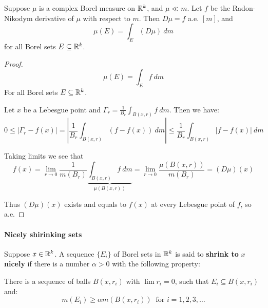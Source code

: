 \begin{theorem}\label{derivative}
    Suppose $\mu$ is a complex Borel measure on $\mathbb{R}^k$, and $\mu \ll m$. Let $f$ be the Radon-Nikodym derivative of $\mu$ with respect to $m$. Then $D\mu = f$ a.e. $[m]$, and
    \[\mu(E) = \int_E(D\mu)~dm\] for all Borel sets $E\subseteq \mathbb{R}^k$.
    \begin{proof}
        \[\mu(E) = \int_E f~dm\] For all Borel sets $E\subseteq \mathbb{R}^k$.

        Let $x$ be a Lebesgue point and $\Gamma_r = \frac{1}{B_r}\int_{B(x,r)}f~dm$. Then we have:\begin{equation*}
            0\leq |\Gamma_r - f(x)| = |\frac{1}{B_r}\int_{B(x,r)}(f-f(x))~dm| \leq \frac{1}{B_r}\int_{B(x,r)}|f-f(x)|~dm
        \end{equation*}

        Taking limits we see that \[f(x) = \lim_{r\rightarrow 0}\frac{1}{m(B_r)}\underbrace{\int_{B(x,r)}f~dm}_{\mu(B(x,r))} = \lim_{r\rightarrow 0}\frac{\mu(B(x,r))}{m(B_r)} = (D\mu)(x) \]
    
        Thus $(D\mu)(x)$ exists and equals to $f(x)$ at every Lebesgue point of $f$, so a.e.
    \end{proof}
\end{theorem}

\paragraph*{Nicely shirinking sets}
\begin{definition}
    Suppose $x\in \mathbb{R}^k$. A sequence $\{E_i\}$ of Borel sets in $\mathbb{R}^k$ is said to \textbf{shrink to }$x$\textbf{ nicely} if there is a number $\alpha>0$ with the following property:\begin{center}
        There is a sequence of balls $B(x,r_i)$ with $\lim r_i = 0$, such that $E_i\subseteq B(x,r_i)$ and:\[m(E_i) \geq \alpha m(B(x,r_i)) \ \text{ for }i=1,2,3,\ldots \]
    \end{center}
\end{definition}

